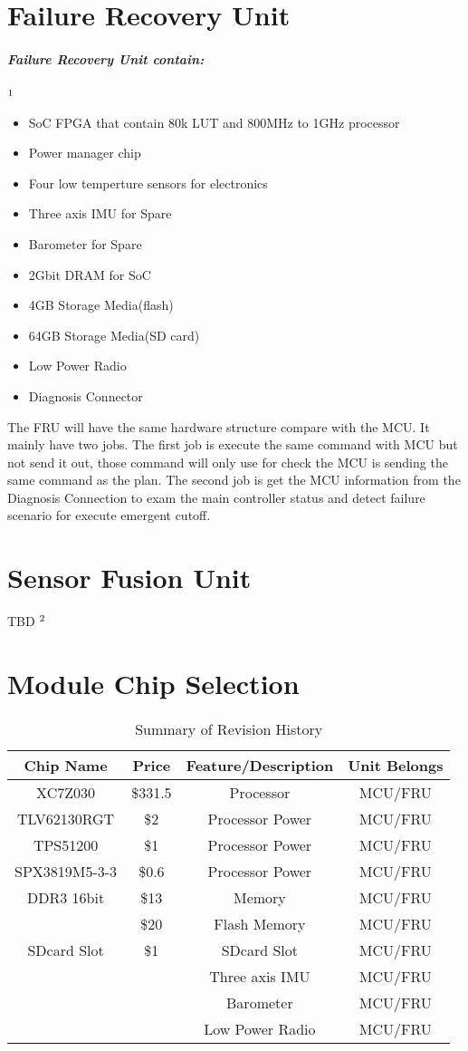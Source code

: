 \documentclass[12pt,article]{memoir}
\begin{document}
\section{Failure Recovery Unit}
\subparagraph{Failure Recovery Unit contain:}$\footnote{The same with the MCU}$
\begin{itemize}
	\item SoC FPGA that contain 80k LUT and 800MHz to 1GHz processor
	\item Power manager chip
	\item Four low temperture sensors for electronics
	\item Three axis IMU for Spare
	\item Barometer for Spare
	\item 2Gbit DRAM for SoC
	\item 4GB Storage Media(flash)
	\item 64GB Storage Media(SD card)
	\item Low Power Radio
	\item Diagnosis Connector
\end{itemize}
The FRU will have the same hardware structure compare with the MCU. It mainly have two jobs. The first job is execute the same command with MCU but not send it out, those command will only use for check the MCU is sending the same command as the plan. The second job is get the MCU information from the Diagnosis Connection to exam the main controller status and detect failure scenario for execute emergent cutoff.
\section{Sensor Fusion Unit}
TBD $\footnote{This unit will not be avaliable in the first version.}$
\newpage
\section{Module Chip Selection}
\begin{table}[H]
	\centering
	\begin{tabu}{ c | c | c | c }
		Chip Name & Price & Feature/Description & Unit Belongs\\ \hline
		 XC7Z030 & \$331.5 & Processor & MCU/FRU \\
		 TLV62130RGT & \$2 & Processor Power & MCU/FRU \\
		 TPS51200 & \$1 & Processor Power & MCU/FRU \\
		 SPX3819M5-3-3 & \$0.6 & Processor Power & MCU/FRU \\
		 DDR3 16bit& \$13 & Memory & MCU/FRU \\
		  & \$20 & Flash Memory & MCU/FRU \\
		 SDcard Slot & \$1 & SDcard Slot & MCU/FRU \\
		 &  & Three axis IMU & MCU/FRU \\
		 &  & Barometer & MCU/FRU \\
		 &  & Low Power Radio & MCU/FRU \\
	\end{tabu}
	\caption{Summary of Revision History}
	\label{tab:slc}
\end{table}
\end{document}
